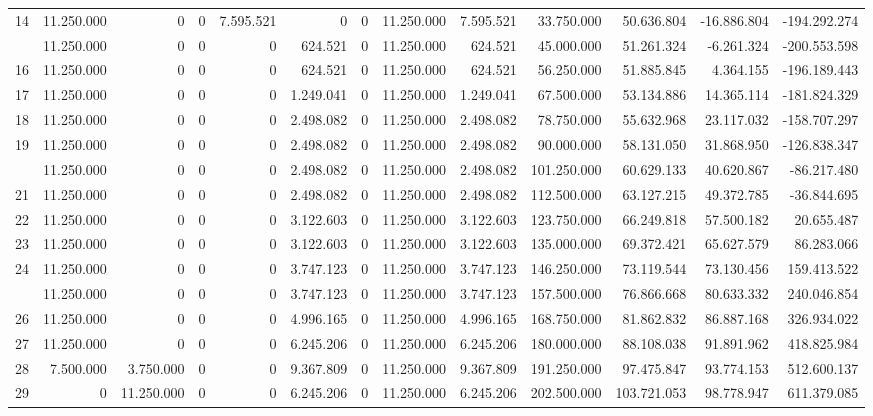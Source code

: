 \documentclass[
  10pt,
  a4paper]{article}
\begin{document}
\begin{landscape}
\begin{longtable}[t]{rrrrrrrrrrrrr}
14 & 11.250.000 & 0 & 0 & 7.595.521 & 0 & 0 & 11.250.000 & 7.595.521 & 33.750.000 & 50.636.804 & -16.886.804 & -194.292.274\\
\addlinespace
15 & 11.250.000 & 0 & 0 & 0 & 624.521 & 0 & 11.250.000 & 624.521 & 45.000.000 & 51.261.324 & -6.261.324 & -200.553.598\\
16 & 11.250.000 & 0 & 0 & 0 & 624.521 & 0 & 11.250.000 & 624.521 & 56.250.000 & 51.885.845 & 4.364.155 & -196.189.443\\
17 & 11.250.000 & 0 & 0 & 0 & 1.249.041 & 0 & 11.250.000 & 1.249.041 & 67.500.000 & 53.134.886 & 14.365.114 & -181.824.329\\
18 & 11.250.000 & 0 & 0 & 0 & 2.498.082 & 0 & 11.250.000 & 2.498.082 & 78.750.000 & 55.632.968 & 23.117.032 & -158.707.297\\
19 & 11.250.000 & 0 & 0 & 0 & 2.498.082 & 0 & 11.250.000 & 2.498.082 & 90.000.000 & 58.131.050 & 31.868.950 & -126.838.347\\
\addlinespace
20 & 11.250.000 & 0 & 0 & 0 & 2.498.082 & 0 & 11.250.000 & 2.498.082 & 101.250.000 & 60.629.133 & 40.620.867 & -86.217.480\\
21 & 11.250.000 & 0 & 0 & 0 & 2.498.082 & 0 & 11.250.000 & 2.498.082 & 112.500.000 & 63.127.215 & 49.372.785 & -36.844.695\\
22 & 11.250.000 & 0 & 0 & 0 & 3.122.603 & 0 & 11.250.000 & 3.122.603 & 123.750.000 & 66.249.818 & 57.500.182 & 20.655.487\\
23 & 11.250.000 & 0 & 0 & 0 & 3.122.603 & 0 & 11.250.000 & 3.122.603 & 135.000.000 & 69.372.421 & 65.627.579 & 86.283.066\\
24 & 11.250.000 & 0 & 0 & 0 & 3.747.123 & 0 & 11.250.000 & 3.747.123 & 146.250.000 & 73.119.544 & 73.130.456 & 159.413.522\\
\addlinespace
25 & 11.250.000 & 0 & 0 & 0 & 3.747.123 & 0 & 11.250.000 & 3.747.123 & 157.500.000 & 76.866.668 & 80.633.332 & 240.046.854\\
26 & 11.250.000 & 0 & 0 & 0 & 4.996.165 & 0 & 11.250.000 & 4.996.165 & 168.750.000 & 81.862.832 & 86.887.168 & 326.934.022\\
27 & 11.250.000 & 0 & 0 & 0 & 6.245.206 & 0 & 11.250.000 & 6.245.206 & 180.000.000 & 88.108.038 & 91.891.962 & 418.825.984\\
28 & 7.500.000 & 3.750.000 & 0 & 0 & 9.367.809 & 0 & 11.250.000 & 9.367.809 & 191.250.000 & 97.475.847 & 93.774.153 & 512.600.137\\
29 & 0 & 11.250.000 & 0 & 0 & 6.245.206 & 0 & 11.250.000 & 6.245.206 & 202.500.000 & 103.721.053 & 98.778.947 & 611.379.085\\

\end{longtable}
\end{landscape}
\end{document}
